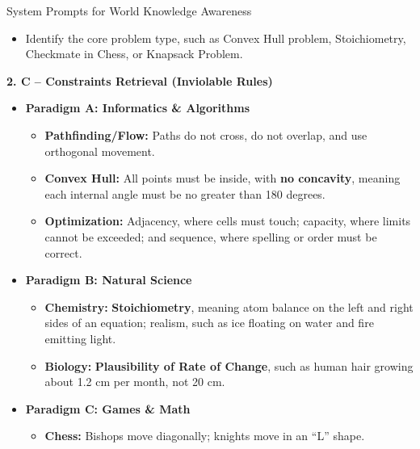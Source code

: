 \begin{promptbox}[label={System Prompts: WA}]{System Prompts for World Knowledge Awareness}
\begin{itemize}[leftmargin=2.2em, labelsep=0.5em, itemsep=2pt]
    \item Identify the core problem type, such as Convex Hull problem, Stoichiometry, Checkmate in Chess, or Knapsack Problem.
\end{itemize}

\medskip

\textbf{2. C -- Constraints Retrieval (Inviolable Rules)}

\begin{itemize}[leftmargin=2.2em, labelsep=0.5em, itemsep=2pt]
    \item \textbf{Paradigm A: Informatics \& Algorithms}
    
    \begin{itemize}[leftmargin=2.2em, labelsep=0.5em, itemsep=2pt]
        \item \textbf{Pathfinding/Flow:} Paths do not cross, do not overlap, and use orthogonal movement.
        
        \item \textbf{Convex Hull:} All points must be inside, with \textbf{no concavity}, meaning each internal angle must be no greater than 180 degrees.
        
        \item \textbf{Optimization:} Adjacency, where cells must touch; capacity, where limits cannot be exceeded; and sequence, where spelling or order must be correct.
    \end{itemize}
    
    \item \textbf{Paradigm B: Natural Science}
    
    \begin{itemize}[leftmargin=2.2em, labelsep=0.5em, itemsep=2pt]
        \item \textbf{Chemistry:} \textbf{Stoichiometry}, meaning atom balance on the left and right sides of an equation; realism, such as ice floating on water and fire emitting light.
        
        \item \textbf{Biology:} \textbf{Plausibility of Rate of Change}, such as human hair growing about 1.2 cm per month, not 20 cm.
    \end{itemize}
    
    \item \textbf{Paradigm C: Games \& Math}
    
    \begin{itemize}[leftmargin=2.2em, labelsep=0.5em, itemsep=2pt]
        \item \textbf{Chess:} Bishops move diagonally; knights move in an ``L'' shape.
        

\end{itemize}
\end{itemize}
\end{promptbox}
